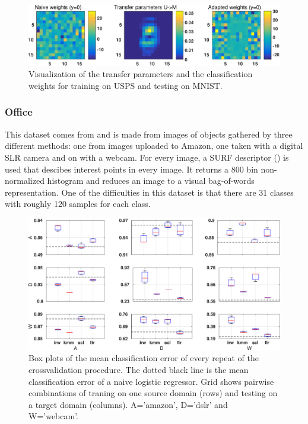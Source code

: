\documentclass[twoside,11pt]{article}
\begin{document}
\begin{figure}[ht]
	\centering
	\includegraphics[width=.9\textwidth]{images/tf_digits.eps}
	\caption{Visualization of the transfer parameters and the classification weights for training on USPS and testing on MNIST.}
	\label{eg_digits2}
\end{figure}

\subsubsection{Office}
This dataset comes from \cite{saenko2010adapting} and is made from images of objects gathered by three different methods: one from images uploaded to Amazon, one taken with a digital SLR camera and on with a webcam. For every image, a SURF descriptor (\citealp{bay2006surf}) is used that descibes interest points in every image. It returns a 800 bin non-normalized histogram and reduces an image to a visual bag-of-words representation. One of the difficulties in this dataset is that there are 31 classes with roughly 120 samples for each class. 

\begin{figure}[ht]
	\centering
	\includegraphics[width=.9\textwidth]{images/err_office_box.eps}
	\caption{Box plots of the mean classification error of every repeat of the crossvalidation procedure. The dotted black line is the mean classification error of a naive logistic regressor. Grid shows pairwise combinations of traning on one source domain (rows) and testing on a target domain (columns). A='amazon', D='dslr' and W='webcam'.}
	\label{err_office3}
\end{figure}
\end{document}
